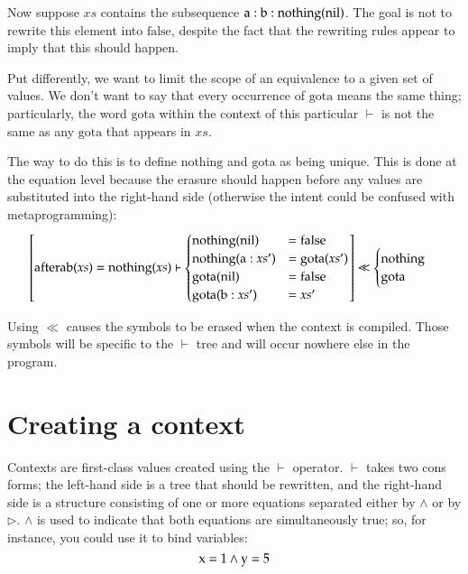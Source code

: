 \documentclass{report}
\def\rewrite {\vdash}
\begin{document}
    Now suppose $xs$ contains the subsequence $\textrm a : \textrm b : \textrm{nothing}(\textrm{nil})$. The goal is not to rewrite this element into $\textrm{false}$, despite the fact that the
    rewriting rules appear to imply that this should happen.

    Put differently, we want to limit the scope of an equivalence to a given set of values. We don't want to say that every occurrence of $\textrm{gota}$ means the same thing; particularly,
    the word $\textrm{gota}$ within the context of this particular $\rewrite$ is not the same as any $\textrm{gota}$ that appears in $xs$.

    The way to do this is to define $\textrm{nothing}$ and $\textrm{gota}$ as being unique. This is done at the equation level because the erasure should happen before any values are
    substituted into the right-hand side (otherwise the intent could be confused with metaprogramming):
    $$
    \left[ \textrm{afterab}(xs) = \textrm{nothing}(xs) \rewrite \begin{cases}
                                                                  \textrm{nothing}(\textrm{nil})    & = \textrm{false} \\
                                                                  \textrm{nothing}(\textrm a : xs') & = \textrm{gota}(xs') \\
                                                                  \textrm{gota}(\textrm{nil})       & = \textrm{false} \\
                                                                  \textrm{gota}(\textrm b : xs')    & = xs'
                                                                \end{cases} \right] \ll \begin{cases} \textrm{nothing} \\ \textrm{gota} \end{cases}
    $$

    Using $\ll$ causes the symbols to be erased when the context is compiled. Those symbols will be specific to the $\rewrite$ tree and will occur nowhere else in the program.

\section{Creating a context}
    Contexts are first-class values created using the $\rewrite$ operator. $\rewrite$ takes two cons forms; the left-hand side is a tree that should be rewritten, and the right-hand side is a
    structure consisting of one or more equations separated either by $\wedge$ or by $\rhd$. $\wedge$ is used to indicate that both equations are simultaneously true; so, for instance, you
    could use it to bind variables:
    $$
      \textrm x = 1 \wedge \textrm y = 5
    $$
\end{document}
